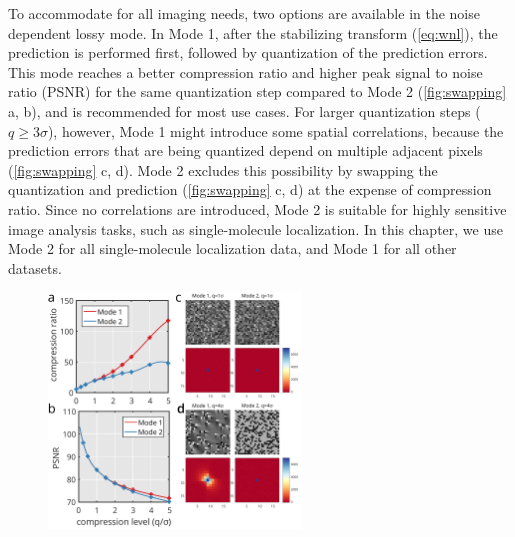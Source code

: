     To accommodate for all imaging needs, two options are available in the noise dependent lossy mode. In Mode 1, after the stabilizing transform (\autoref{eq:wnl}), the prediction is performed first, followed by quantization of the prediction errors. This mode reaches a better compression ratio and higher peak signal to noise ratio (PSNR) for the same quantization step compared to Mode 2 (\autoref{fig:swapping} a, b), and is recommended for most use cases. For larger quantization steps ($q \geq 3 \sigma$), however, Mode 1 might introduce some spatial correlations, because the prediction errors that are being quantized depend on multiple adjacent pixels (\autoref{fig:swapping} c, d). Mode 2 excludes this possibility by swapping the quantization and prediction (\autoref{fig:swapping} c, d) at the expense of compression ratio. Since no correlations are introduced, Mode 2 is suitable for highly sensitive image analysis tasks, such as single-molecule localization. In this chapter, we use Mode 2 for all single-molecule localization data, and Mode 1 for all other datasets.
  
    \begin{figure}[bhtp]
      \centering
      \includegraphics[page=1,width=0.6\textwidth]{swapping}
      \label{fig:swapping}
    \end{figure}


